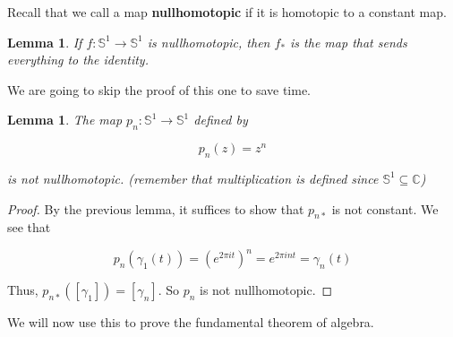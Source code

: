 \documentclass[a4paper]{article}
\newtheorem{lemma}[theorem]{Lemma}
\numberwithin{theorem}{section}
\begin{document}
Recall that we call a map \textbf{nullhomotopic} if it is homotopic to a constant map.

\begin{lemma}
If $f: \mathbb{S}^1 \rightarrow \mathbb{S}^1$ is nullhomotopic, then $f_*$ is the map that sends everything to the identity.
\end{lemma}

We are going to skip the proof of this one to save time. 

\begin{lemma}
The map $p_n: \mathbb{S}^1 \rightarrow \mathbb{S}^1$ defined by 

$$ p_n(z) = z^n $$

is not nullhomotopic. (remember that multiplication is defined since $\mathbb{S}^1 \subseteq \mathbb{C}$)
\end{lemma}

\begin{proof}
By the previous lemma, it suffices to show that $p_{n*}$ is not constant. We see that 

$$ p_n(\gamma_1(t)) = (e^{2 \pi i t})^n = e^{2 \pi i n t} = \gamma_n(t) $$

Thus, $p_{n*}([\gamma_1]) = [\gamma_n]$. So $p_n$ is not nullhomotopic.
\end{proof}

We will now use this to prove the fundamental theorem of algebra.
\end{document}

